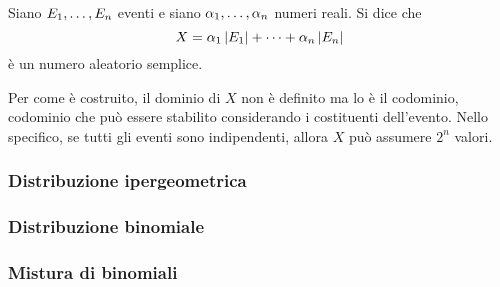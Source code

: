 \documentclass{subfiles}
\begin{document}
Siano \(\List{E}{1}{n}\) eventi e siano \(\List{\alpha}{1}{n}\) numeri reali.
Si dice che
\[
    X = \alpha_{1}\left\vert {E_{1}} \right\vert + \cdots + \alpha_{n}\left\vert {E_{n}} \right\vert
\]
è un numero aleatorio semplice.

Per come è costruito, il dominio di \(X\) non è definito ma lo è il codominio,
codominio che può essere stabilito considerando i costituenti dell'evento.
Nello specifico, se tutti gli eventi sono indipendenti, allora \(X\) può assumere \(2^{n}\) valori.

\subsubsection{Distribuzione ipergeometrica}

\clearpage

\subsubsection{Distribuzione binomiale}


\subsubsection{Mistura di binomiali}

\end{document}
